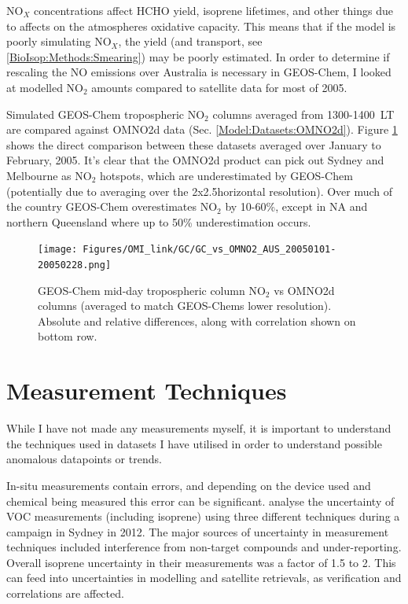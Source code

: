     NO$_X$ concentrations affect HCHO yield, isoprene lifetimes, and other things due to affects on the atmospheres oxidative capacity.
    This means that if the model is poorly simulating NO$_X$, the yield (and transport, see \ref{BioIsop:Methods:Smearing}) may be poorly estimated.
    In order to determine if rescaling the NO emissions over Australia is necessary in GEOS-Chem, I looked at modelled NO$_2$ amounts compared to satellite data for most of 2005.
    
    
    Simulated GEOS-Chem tropospheric NO$_2$ columns averaged from 1300-1400~LT are compared against OMNO2d data (Sec. \ref{Model:Datasets:OMNO2d}). 
    Figure \ref{Model:Filter:NOx:fig_GC_vs_OMNO2d_AUS_Sum_2005} shows the direct comparison between these datasets averaged over January to February, 2005.
    It's clear that the OMNO2d product can pick out Sydney and Melbourne as NO$_2$ hotspots, which are underestimated by GEOS-Chem (potentially due to averaging over the 2x2.5\degr horizontal resolution).
    Over much of the country GEOS-Chem overestimates NO$_2$ by 10-60\%, except in NA and northern Queensland where up to 50\% underestimation occurs.
    
    \begin{figure}
      \texttt{[image: Figures/OMI\_link/GC/GC\_vs\_OMNO2\_AUS\_20050101-20050228.png]}
      \caption{%
        GEOS-Chem mid-day tropospheric column NO$_2$ vs OMNO2d columns (averaged to match GEOS-Chems lower resolution).
        Absolute and relative differences, along with correlation shown on bottom row.
        }
      \label{Model:Filter:NOx:fig_GC_vs_OMNO2d_AUS_Sum_2005}
    \end{figure}


\section{Measurement Techniques}
  \label{Model:Meas}
  While I have not made any measurements myself, it is important to understand the techniques used in datasets I have utilised in order to understand possible anomalous datapoints or trends.
  
  In-situ measurements contain errors, and depending on the device used and chemical being measured this error can be significant.
  \textcite{Dunne2017} analyse the uncertainty of VOC measurements (including isoprene) using three different techniques during a campaign in Sydney in 2012.
  The major sources of uncertainty in measurement techniques included interference from non-target compounds and under-reporting.
  Overall isoprene uncertainty in their measurements was a factor of 1.5 to 2.
  This can feed into uncertainties in modelling and satellite retrievals, as verification and correlations are affected.
  
